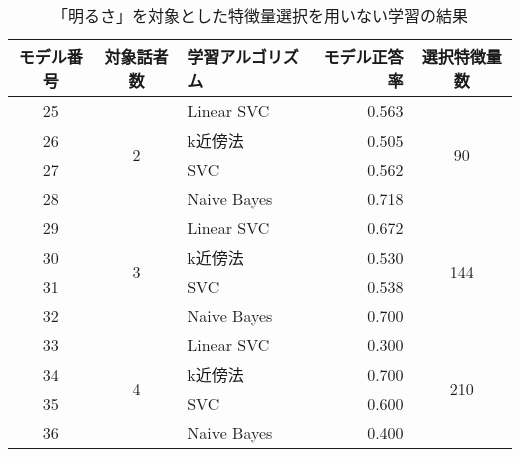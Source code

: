 \begin{table}[ptb]
    \caption{「明るさ」を対象とした特徴量選択を用いない学習の結果}
    \centering
    \begin{tabular}{|c|c|l|r|c|}
        \hline
        モデル番号 & 対象話者数 & 学習アルゴリズム & モデル正答率 & 選択特徴量数 \\\hline\hline
        25 & \multirow{4}{*}{2} & Linear SVC & 0.563 & \multirow{4}{*}{90} \\ \cline{1-1}\cline{3-4}
        26 & & k近傍法 & 0.505 & \\ \cline{1-1}\cline{3-4}
        27 & & SVC & 0.562 & \\ \cline{1-1}\cline{3-4}
        28 & & Naive Bayes & 0.718 & \\ \hline
        29 & \multirow{4}{*}{3} & Linear SVC & 0.672 & \multirow{4}{*}{144} \\ \cline{1-1}\cline{3-4}
        30 & & k近傍法 & 0.530 & \\ \cline{1-1}\cline{3-4}
        31 & & SVC & 0.538 & \\ \cline{1-1}\cline{3-4}
        32 & & Naive Bayes & 0.700 & \\ \hline
        33 & \multirow{4}{*}{4} & Linear SVC & 0.300 & \multirow{4}{*}{210} \\ \cline{1-1}\cline{3-4}
        34 & & k近傍法 & 0.700 & \\ \cline{1-1}\cline{3-4}
        35 & & SVC & 0.600 & \\ \cline{1-1}\cline{3-4}
        36 & & Naive Bayes & 0.400 & \\ \hline
    \end{tabular}
    \label{tab:cheerfulness_learning_result_without_FS}
\end{table}


